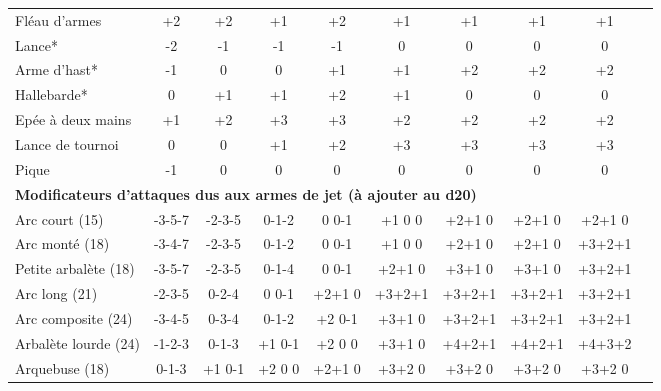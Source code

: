 \begin{tabular}{cccccccccccc}
\multicolumn{3}{l}{Fléau d'armes}     & +2 & +2 & +1 & +2 & +1 & +1 & +1 & +1 \\
\multicolumn{3}{l}{Lance*}            & -2 & -1 & -1 & -1 &  0 &  0 &  0 &  0 \\
\multicolumn{3}{l}{Arme d'hast*}      & -1 &  0 &  0 & +1 & +1 & +2 & +2 & +2 \\
\multicolumn{3}{l}{Hallebarde*}       &  0 & +1 & +1 & +2 & +1 &  0 &  0 &  0 \\
\multicolumn{3}{l}{Epée à deux mains} & +1 & +2 & +3 & +3 & +2 & +2 & +2 & +2 \\
\multicolumn{3}{l}{Lance de tournoi}  &  0 &  0 & +1 & +2 & +3 & +3 & +3 & +3 \\
\multicolumn{3}{l}{Pique}             & -1 &  0 &  0 &  0 &  0 &  0 &  0 &  0 \\
\multicolumn{11}{l}{\textbf{Modificateurs d'attaques dus aux armes de jet (à ajouter au d20)}} \\
\multicolumn{3}{l}{Arc court (15)}       & \footnotesize-3-5-7 & \footnotesize-2-3-5 & \footnotesize0-1-2 & \footnotesize0 0-1 & \footnotesize+1 0 0 & \footnotesize+2+1 0 & \footnotesize+2+1 0 & \footnotesize+2+1 0 \\
\multicolumn{3}{l}{Arc monté (18)}       & \footnotesize-3-4-7 & \footnotesize-2-3-5 & \footnotesize0-1-2 & \footnotesize0 0-1 & \footnotesize+1 0 0 & \footnotesize+2+1 0 & \footnotesize+2+1 0 & \footnotesize+3+2+1 \\
\multicolumn{3}{l}{Petite arbalète (18)} & \footnotesize-3-5-7 & \footnotesize-2-3-5 & \footnotesize0-1-4 & \footnotesize0 0-1 & \footnotesize+2+1 0 & \footnotesize+3+1 0 & \footnotesize+3+1 0 & \footnotesize+3+2+1 \\
\multicolumn{3}{l}{Arc long (21)}        & \footnotesize-2-3-5 & \footnotesize 0-2-4 & \footnotesize0 0-1 &\footnotesize+2+1 0 & \footnotesize+3+2+1 & \footnotesize+3+2+1 & \footnotesize+3+2+1 & \footnotesize+3+2+1 \\
\multicolumn{3}{l}{Arc composite (24)}   & \footnotesize-3-4-5 & \footnotesize 0-3-4 & \footnotesize0-1-2 &\footnotesize+2 0-1 & \footnotesize+3+1 0 & \footnotesize+3+2+1 & \footnotesize+3+2+1 & \footnotesize+3+2+1 \\
\multicolumn{3}{l}{Arbalète lourde (24)} & \footnotesize-1-2-3 & \footnotesize 0-1-3 &\footnotesize+1 0-1 &\footnotesize+2 0 0 & \footnotesize+3+1 0 & \footnotesize+4+2+1 & \footnotesize+4+2+1 & \footnotesize+4+3+2 \\
\multicolumn{3}{l}{Arquebuse (18)}       &  \footnotesize0-1-3 & \footnotesize+1 0-1 &\footnotesize+2 0 0 &\footnotesize+2+1 0 & \footnotesize+3+2 0 & \footnotesize+3+2 0 & \footnotesize+3+2 0 & \footnotesize+3+2 0 \\
\end{tabular}

